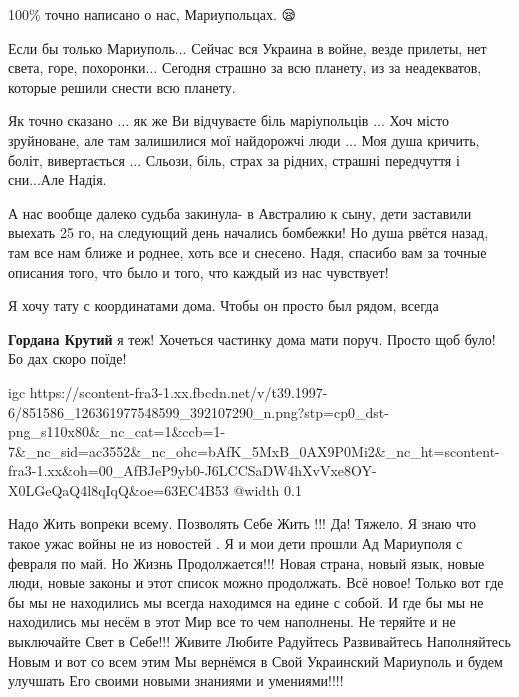 100\% точно написано о нас, Мариупольцах. 😪


Если бы только Мариуполь... Сейчас вся Украина в войне, везде прилеты, нет
света, горе, похоронки... Сегодня страшно за всю планету, из за
неадекватов, которые решили снести всю планету.


Як точно сказано ... як же Ви відчуваєте біль маріупольців ... Хоч місто
зруйноване, але там залишилися мої найдорожчі люди ... Моя душа кричить, боліт,
вивертається ... Сльози, біль, страх за рідних, страшні передчуття і сни...Але
Надія.


А нас вообще далеко судьба закинула- в Австралию к сыну, дети заставили выехать
25 го, на следующий день начались бомбежки! Но душа рвётся назад, там все нам
ближе и роднее, хоть все и снесено. Надя, спасибо вам за точные описания того,
что было и того, что каждый из нас чувствует!


Я хочу тату с координатами дома. Чтобы он просто был рядом, всегда

\begin{itemize} %
\textbf{Гордана Крутий} я теж! Хочеться частинку дома мати поруч. Просто щоб було! Бо дах скоро поїде!
\end{itemize} %


\ifcmt
  igc https://scontent-fra3-1.xx.fbcdn.net/v/t39.1997-6/851586_126361977548599_392107290_n.png?stp=cp0_dst-png_s110x80&_nc_cat=1&ccb=1-7&_nc_sid=ac3552&_nc_ohc=bAfK_5MxB_0AX9P0Mi2&_nc_ht=scontent-fra3-1.xx&oh=00_AfBJeP9yb0-J6LCCSaDW4hXvVxe8OY-X0LGeQaQ4l8qIqQ&oe=63EC4B53
	@width 0.1
\fi


Надо Жить вопреки всему. Позволять Себе Жить !!! Да! Тяжело. Я знаю что такое
ужас войны не из новостей . Я и мои дети прошли Ад Мариуполя с февраля по май.
Но Жизнь Продолжается!!! Новая страна, новый язык, новые люди, новые законы и
этот список можно продолжать. Всё новое! Только вот где бы мы не находились мы
всегда находимся на едине с собой. И где бы мы не находились мы несём в этот
Мир все то чем наполнены. Не теряйте и не выключайте Свет в Себе!!! Живите
Любите Радуйтесь Развивайтесь Наполняйтесь Новым и вот со всем этим Мы вернёмся
в Свой Украинский Мариуполь и будем улучшать Его своими новыми знаниями и
умениями!!!!


